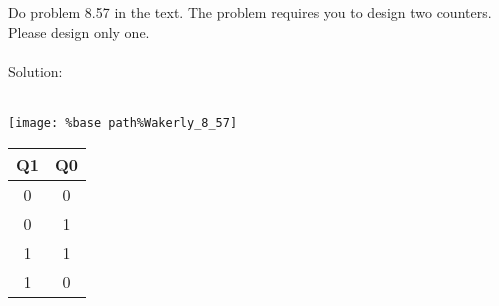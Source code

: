 Do problem 8.57 in the text.  The problem requires you to design two counters.  Please design only one.\\ \\

Solution: \\ \\
\begin{center}
  \texttt{[image: \%base path\%Wakerly\_8\_57]} \\
  \begin{tabular}{cc}
    \textbf{Q1} & \textbf{Q0} \\
    \hline
    0 & 0 \\
    0 & 1 \\
    1 & 1 \\
    1 & 0 \\
  \end{tabular}
\end{center}
